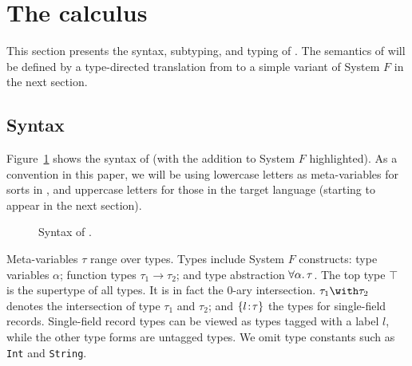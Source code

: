 \section{The \name calculus} \label{sec:fi}

This section presents the syntax, subtyping, and typing of \name.  The
semantics of \name will be defined by a type-directed translation from
\name to a simple variant of System $F$ in the next section.

\subsection{Syntax}

Figure~\ref{fig:fi-syntax} shows the syntax of \name (with the addition to
System $F$ highlighted). As a convention in this paper, we will be using
lowercase letters as meta-variables for sorts in \name, and uppercase letters
for those in the target language (starting to appear in the next section).


\begin{figure}[h]
  
  \caption{Syntax of \name.}
  \label{fig:fi-syntax}
\end{figure}


Meta-variables $\tau$ range over types. Types include System $F$ constructs:
type variables $\alpha$; function types $\tau_1 \to \tau_2$; and type
abstraction $ \forall \alpha. \, \tau $. The top type $\top$ is the supertype of all
types. It is in fact the $0$-ary intersection. $\tau_1 \andop \tau_2$ denotes
the intersection of type $\tau_1$ and $\tau_2$; and $\{ l \!:\! \tau \}$ the types
for single-field records. Single-field record types can be viewed as types
tagged with a label $l$, while the other type forms are untagged types. We omit
type constants such as \lstinline$Int$ and \lstinline$String$.

